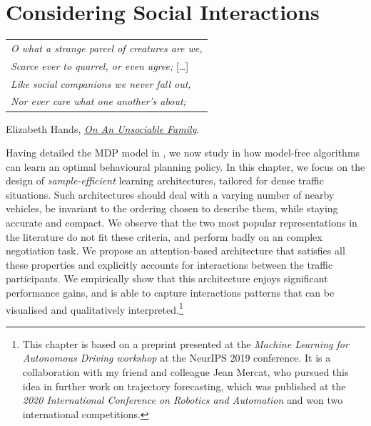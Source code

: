 
\graphicspath{{2-Chapters/4-Chapter/}}


\chapter{Considering Social Interactions}
\label{chapter:4}


\begin{flushright}
	\begin{tabular}{@{}l@{}}
		\emph{O what a strange parcel of creatures are we,}\\
		\emph{Scarce ever to quarrel, or even agree;} [\dots]\\
		\emph{Like social companions we never fall out,}\\
		\emph{Nor ever care what one another’s about;}\\
	\end{tabular}
	
	Elizabeth Hands, \href{https://eleurent.github.io/sisyphe/texts/unsociable_family.html}{\emph{On An Unsociable Family}}.
\end{flushright}

\abstractStartChapter{}%
Having detailed the \gls{MDP} model in , we now study in  how model-free  algorithms can learn an optimal behavioural planning policy. In this chapter, we focus on the design of \emph{sample-efficient} learning architectures, tailored for dense traffic situations. Such architectures should deal with a varying number of nearby vehicles, be invariant to the ordering chosen to describe them, while staying accurate and compact. We observe that the two most popular representations in the literature do not fit these criteria, and perform badly on an complex negotiation task. We propose an attention-based architecture that satisfies all these properties and explicitly accounts for interactions between the traffic participants. We empirically show that this architecture enjoys significant performance gains, and is able to capture interactions patterns that can be visualised and qualitatively interpreted.\footnote{This chapter is based on a preprint \citep{Leurent2019social} presented at the \emph{Machine Learning for Autonomous Driving workshop} at the NeurIPS 2019 conference. It is a collaboration with my friend and colleague Jean Mercat, who pursued this idea in further work on trajectory forecasting, which was published at the \emph{2020 International Conference on Robotics and Automation} \citep{Mercat2020} and won two international competitions.}
\minitocStartChapter{}

